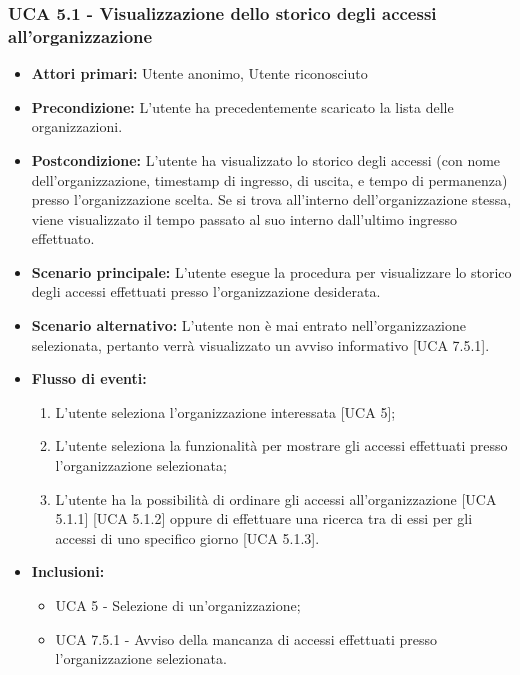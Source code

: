 \subsubsection{UCA 5.1 - Visualizzazione dello storico degli accessi all'organizzazione}
\begin{itemize}
    \item \textbf{Attori primari:} Utente anonimo, Utente riconosciuto
    \item \textbf{Precondizione:} L'utente ha precedentemente scaricato la lista delle organizzazioni.
    \item \textbf{Postcondizione:} L'utente ha visualizzato lo storico degli accessi (con nome dell'organizzazione, timestamp di ingresso, di uscita, e tempo di permanenza) presso l'organizzazione scelta. Se si trova all'interno dell'organizzazione stessa, viene visualizzato il tempo passato al suo interno dall'ultimo ingresso effettuato.
    \item \textbf{Scenario principale:} L'utente esegue la procedura per visualizzare lo storico degli accessi effettuati presso l'organizzazione desiderata.
    \item \textbf{Scenario alternativo:} L'utente non è mai entrato nell'organizzazione selezionata, pertanto verrà visualizzato un avviso informativo [UCA 7.5.1].
    \item \textbf{Flusso di eventi:}
    \begin{enumerate}
        \item L'utente seleziona l'organizzazione interessata [UCA 5];
        \item L'utente seleziona la funzionalità per mostrare gli accessi effettuati presso l'organizzazione selezionata;
        \item L'utente ha la possibilità di ordinare gli accessi all'organizzazione [UCA 5.1.1] [UCA 5.1.2] oppure di effettuare una ricerca tra di essi per gli accessi di uno specifico giorno [UCA 5.1.3].
    \end{enumerate}
    \item \textbf{Inclusioni:}
    \begin{itemize}
        \item UCA 5 - Selezione di un'organizzazione;
    \end{itemize}
    \begin{itemize}
        \item UCA 7.5.1 - Avviso della mancanza di accessi effettuati presso l'organizzazione selezionata.
    \end{itemize}
\end{itemize}

